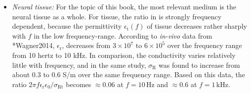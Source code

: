 \begin{itemize}
\item \textit{Neural tissue:} For the topic of this book, the most relevant medium is the neural tissue as a whole. 
For tissue, the ratio in  is strongly frequency dependent, 
because the permittivity $\epsilon_\text{t}(f)$ of tissue decreases rather sharply with $f$ in the low frequency-range. 
According to \textit{in-vivo} data from \citeasnoun**{Wagner2014}, $\epsilon_\text{r}$, decreases from $3\times10^7$ to $6\times 10^5$ over the frequency range from 10 \si{hertz} to 10 \si{\kilo\hertz}.
In comparison, the conductivity varies relatively little with frequency, 
and in the same study, $\sigma_\text{R}$ was found to increase from about 0.3 to 0.6 \si{S/m} 
over the same frequency range. Based on this data, 
the ratio $2\pi f \epsilon_\text{r}\epsilon_0/\sigma_\text{Rt}$ becomes $\approx 0.06$ at $f = 10 \, \si{\hertz}$ 
and $\approx 0.6 $ at $f = 1 \, \si{\kilo\hertz}$. 


\end{itemize}
